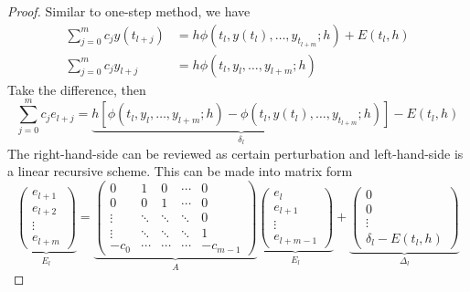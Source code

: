 \begin{proof}
    Similar to one-step method, we have 
    \begin{equation}
        \begin{aligned}
            \sum_{j=0}^m c_j y(t_{l+j}) &= h \phi(t_l, y(t_l),\dots, y_{t_{l+m}}; h) + E(t_l, h) \\
            \sum_{j=0}^m c_j y_{l+j} &= h \phi(t_l, y_l,\dots, y_{l+m}; h) 
        \end{aligned}
    \end{equation}
    Take the difference, then 
    \begin{equation}
        \sum_{j=0}^m c_j e_{l+j} = \underbrace{h\left[  \phi(t_l, y_l,\dots, y_{l+m}; h)  - \phi(t_l, y(t_l),\dots, y_{t_{l+m}}; h)  \right]}_{\delta_l} - E(t_l, h)
    \end{equation}
    The right-hand-side can be reviewed as certain perturbation and left-hand-side is a linear recursive scheme. This can be made into matrix form 
    \begin{equation}
        \underbrace{\begin{pmatrix}
            e_{l+1} \\ e_{l+2}\\ \vdots \\ e_{l +m} 
        \end{pmatrix}}_{E_l} = 
        \underbrace{\begin{pmatrix}
            0& 1 & 0 & \cdots  & 0\\
            0& 0 & 1 & \cdots &  0 \\
            \vdots & \ddots & \ddots & \ddots  & 0\\
            \vdots & \ddots & \ddots & \ddots  & 1\\
            -c_0 & \cdots & \cdots & \cdots  &- c_{m-1} 
        \end{pmatrix}}_{A}
        \underbrace{\begin{pmatrix}
            e_{l} \\ e_{l+1}\\ \vdots \\ e_{l +m-1} 
        \end{pmatrix}}_{E_l} + 
        \underbrace{\begin{pmatrix}
            0 \\0\\ \vdots \\ \delta_l - E(t_l, h)
        \end{pmatrix}}_{\Delta_l}  
    \end{equation}

\end{proof}
